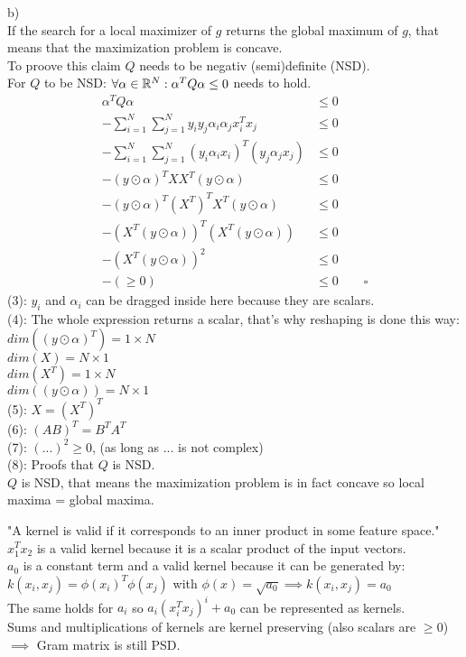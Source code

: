 \begin{flushleft}
b)\\
If the search for a local maximizer of $g$ returns the global maximum of $g$, that
means that the maximization problem is concave.\\
To proove this claim $Q$ needs to be negativ (semi)definite (NSD).\\
For $Q$ to be NSD: $\forall \alpha \in \mathbb{R}^{N}: \alpha^{T}Q\alpha \leq 0$ 
needs to hold.\\
\begin{align}
\alpha^{T}Q\alpha &\leq 0\\
-\sum_{i=1}^{N}\sum_{j=1}^{N}y_{i}y_{j}\alpha_{i}\alpha_{j}x^{T}_{i}x_{j} &\leq 0\\
-\sum_{i=1}^{N}\sum_{j=1}^{N}(y_{i}\alpha_{i}x_{i})^{T}(y_{j}\alpha_{j}x_{j}) &\leq 0\\
-(y\odot\alpha)^{T}XX^{T}(y\odot\alpha) &\leq 0\\
-(y\odot\alpha)^{T}(X^{T})^{T}X^{T}(y\odot\alpha) &\leq 0\\
-(X^{T}(y\odot\alpha))^{T}(X^{T}(y\odot\alpha)) &\leq 0\\
-(X^{T}(y\odot\alpha))^{2} &\leq 0\\
-(\geq 0) &\leq 0 \qquad \square
\end{align}
(3): $y_{i}$ and $\alpha_{i}$ can be dragged inside here because they are scalars.\\
(4): The whole expression returns a scalar, that's why reshaping is done this way:\\
$dim((y\odot\alpha)^{T})= 1 \times N$\\
$dim(X)= N \times 1$\\
$dim(X^{T})= 1 \times N$\\
$dim((y\odot\alpha))= N \times 1$\\
(5): $X=(X^{T})^{T}$\\
(6): $(AB)^{T}=B^{T}A^{T}$\\
(7): $(...)^{2} \geq 0 $, (as long as $...$ is not complex)\\
(8): Proofs that $Q$ is NSD.\\
$Q$ is NSD, that means the maximization problem is in fact concave so local maxima = global maxima.
\end{flushleft}
%
%
%
%
%
%
%
%
%
\begin{flushleft}
"A kernel is valid if it corresponds to an inner product in some feature space."\\
$x_{1}^{T}x_{2}$ is a valid kernel because it is a scalar product of the input vectors.\\
$a_{0}$ is a constant term and a valid kernel because it can be generated by:\\
$k(x_i,x_j) = \phi(x_i)^T\phi(x_j)$ with $\phi(x) = \sqrt{a_0} \implies k(x_i,x_j) = a_0$\\
The same holds for $a_i$ so $a_i(x_i^T x_j)^i + a_0$ can be represented as kernels.\\
Sums and multiplications of kernels are kernel preserving (also scalars are $\geq 0$)\\
$\implies$ Gram matrix is still PSD.
\end{flushleft}
